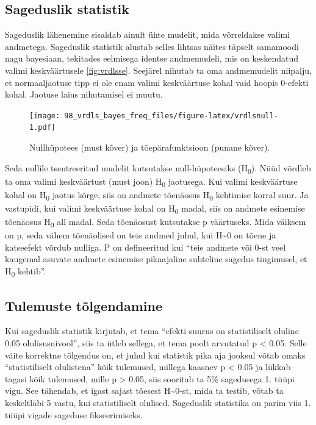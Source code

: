 \documentclass[]{book}
\begin{document}
\subsection*{Sageduslik statistik}\label{sageduslik-statistik}

Sageduslik lähenemine sisaldab ainult ühte mudelit, mida võrreldakse
valimi andmetega. Sageduslik statistik alustab selles lihtsas näites
täpselt samamoodi nagu bayesiaan, tekitades eelmisega identse
andmemudeli, mis on keskendatud valimi keskväärtusele \ref{fig:vrdlsse}.
Seejärel nihutab ta oma andmemudelit niipalju, et normaaljaotuse tipp ei
ole enam valimi keskväärtuse kohal vaid hoopis 0-efekti kohal. Jaotuse
laius nihutamisel ei muutu.

\begin{figure}
\centering
\texttt{[image: 98\_vrdls\_bayes\_freq\_files/figure-latex/vrdlsnull-1.pdf]}
\caption{\label{fig:vrdlsnull}Nullhüpotees (must kõver) ja tõepärafunktsioon
(punane kõver).}
\end{figure}

Seda nullile tsentreeritud mudelit kutsutakse null-hüpoteesiks
(H\textsubscript{0}). Nüüd võrdleb ta oma valimi keskväärtust (must
joon) H\textsubscript{0} jaotusega. Kui valimi keskväärtuse kohal on
H\textsubscript{0} jaotus kõrge, siis on andmete tõenäosus
H\textsubscript{0} kehtimise korral suur. Ja vastupidi, kui valimi
keskväärtuse kohal on H\textsubscript{0} madal, siis on andmete
esinemise tõenäosus H\textsubscript{0} all madal. Seda tõenäosust
kutsutakse p väärtuseks. Mida väiksem on p, seda vähem tõenäolised on
teie andmed juhul, kui H\textasciitilde{}0 on tõene ja katseefekt võrdub
nulliga. P on defineeritud kui ``teie andmete või 0-st veel kaugemal
asuvate andmete esinemise pikaajaline suhteline sagedus tingimusel, et
H\textsubscript{0} kehtib''.

\subsection*{Tulemuste tõlgendamine}\label{tulemuste-tolgendamine}

Kui sageduslik statistik kirjutab, et tema ``efekti suurus on
statistiliselt oluline 0.05 olulisusnivool'', siis ta ütleb sellega, et
tema poolt arvutatud p \textless{} 0.05. Selle väite korrektne tõlgendus
on, et juhul kui statistik pika aja jooksul võtab omaks ``statistiliselt
olulistena'' kõik tulemused, millega kaasnev p \textless{} 0.05 ja
lükkab tagasi kõik tulemused, mille p \textgreater{} 0.05, siis sooritab
ta 5\% sagedusega 1. tüüpi vigu. See tähendab, et igast sajast tõesest
H\textasciitilde{}0-st, mida ta testib, võtab ta keskeltläbi 5 vastu,
kui statistiliselt olulised. Sageduslik statistika on parim viis 1.
tüüpi vigade sageduse fikseerimiseks.
\end{document}
